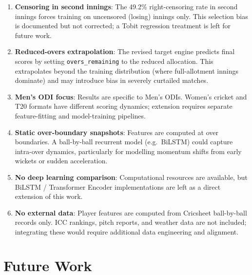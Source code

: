 \documentclass[12pt,a4paper,oneside]{report}
\begin{document}
\begin{enumerate}
    \item \textbf{Censoring in second innings}: The 49.2\% right-censoring rate in second innings forces training on uncensored (losing) innings only.  This selection bias is documented but not corrected; a Tobit regression treatment is left for future work.

    \item \textbf{Reduced-overs extrapolation}: The revised target engine predicts final scores by setting \texttt{overs\_remaining} to the reduced allocation.  This extrapolates beyond the training distribution (where full-allotment innings dominate) and may introduce bias in severely curtailed matches.

    \item \textbf{Men's ODI focus}: Results are specific to Men's ODIs.  Women's cricket and T20 formats have different scoring dynamics; extension requires separate feature-fitting and model-training pipelines.

    \item \textbf{Static over-boundary snapshots}: Features are computed at over boundaries.  A ball-by-ball recurrent model (e.g.\ BiLSTM) could capture intra-over dynamics, particularly for modelling momentum shifts from early wickets or sudden acceleration.

    \item \textbf{No deep learning comparison}: Computational resources are available, but BiLSTM / Transformer Encoder implementations are left as a direct extension of this work.

    \item \textbf{No external data}: Player features are computed from Cricsheet ball-by-ball records only.  ICC rankings, pitch reports, and weather data are not included; integrating these would require additional data engineering and alignment.
\end{enumerate}

\section{Future Work}
\end{document}

